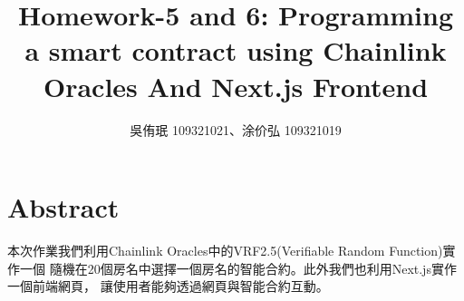 \documentclass[12pt,a4paper]{article}
\title{Homework-5 and 6: Programming a smart contract using Chainlink Oracles And Next.js Frontend}
\author{吳侑珉 109321021、涂价弘 109321019}
\begin{document}
 \date{} \maketitle

\tableofcontents

\pagebreak

\section{Abstract}

本次作業我們利用Chainlink Oracles中的VRF2.5(Verifiable Random Function)實作一個
隨機在20個房名中選擇一個房名的智能合約。此外我們也利用Next.js實作一個前端網頁，
讓使用者能夠透過網頁與智能合約互動。






\pagebreak
\printbibliography
\end{document}
